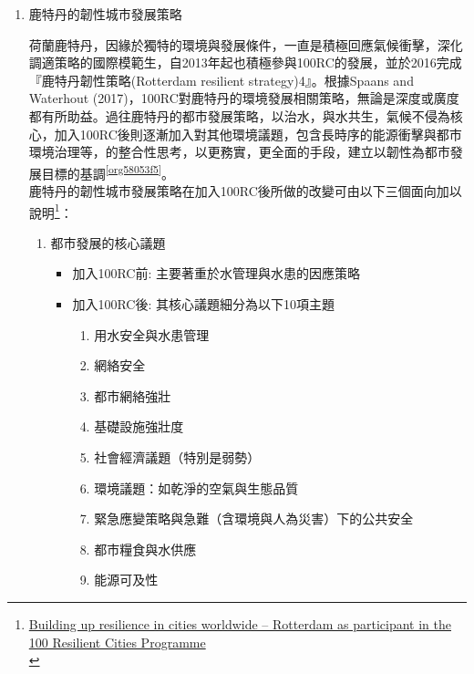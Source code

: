 \documentclass[a4paper,12pt]{article}
\begin{document}
\begin{enumerate}
\begin{enumerate}
\item 鹿特丹的韌性城市發展策略
\label{sec:org7c19954}

荷蘭鹿特丹，因緣於獨特的環境與發展條件，一直是積極回應氣候衝擊，深化調適策略的國際模範生，自2013年起也積極參與100RC的發展，並於2016完成『鹿特丹韌性策略(Rotterdam resilient strategy)4』。根據Spaans and Waterhout (2017)，100RC對鹿特丹的環境發展相關策略，無論是深度或廣度都有所助益。過往鹿特丹的都市發展策略，以治水，與水共生，氣候不侵為核心，加入100RC後則逐漸加入對其他環境議題，包含長時序的能源衝擊與都市環境治理等，的整合性思考，以更務實，更全面的手段，建立以韌性為都市發展目標的基調\textsuperscript{\ref{org58053f5}}。\\

鹿特丹的韌性城市發展策略在加入100RC後所做的改變可由以下三個面向加以說明\footnote{\href{https://www.sciencedirect.com/science/article/abs/pii/S0264275116301159}{Building up resilience in cities worldwide – Rotterdam as participant in the 100 Resilient Cities Programme}\\}：\\
\begin{enumerate}
\item 都市發展的核心議題\\
\begin{itemize}
\item 加入100RC前: 主要著重於水管理與水患的因應策略\\
\item 加入100RC後: 其核心議題細分為以下10項主題\\
\begin{enumerate}
\item 用水安全與水患管理\\
\item 網絡安全\\
\item 都市網絡強壯\\
\item 基礎設施強壯度\\
\item 社會經濟議題（特別是弱勢）\\
\item 環境議題：如乾淨的空氣與生態品質\\
\item 緊急應變策略與急難（含環境與人為災害）下的公共安全\\
\item 都市糧食與水供應\\
\item 能源可及性\\

\end{enumerate}
\end{itemize}
\end{enumerate}
\end{enumerate}
\end{enumerate}
\end{document}
